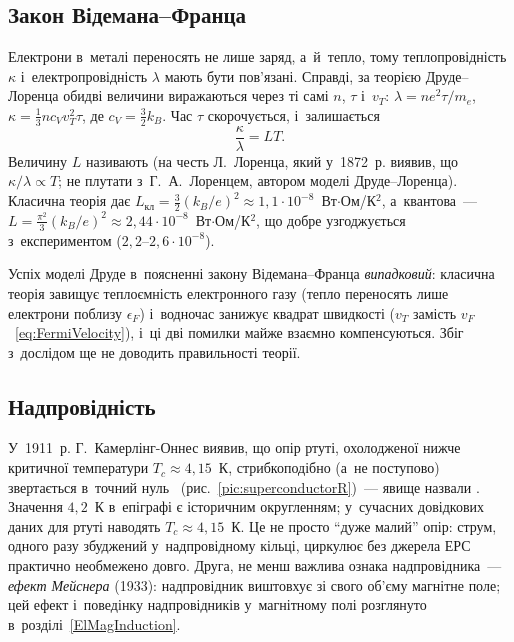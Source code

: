 \subsection*{Закон Відемана--Франца}


Електрони в~металі переносять не лише заряд, а~й~тепло, тому теплопровідність $\kappa$
і~електропровідність $\lambda$ мають бути пов'язані. Справді, за теорією Друде--Лоренца
обидві величини виражаються через ті самі $n$, $\tau$ і~$v_T$: $\lambda=ne^2\tau/m_e$,
$\kappa=\tfrac13nc_Vv_T^2\tau$, де $c_V=\tfrac32k_B$. Час $\tau$ скорочується,
і~залишається
\begin{equation}\label{eq:WiedemannFranz}
	\frac{\kappa}{\lambda} = L T.
\end{equation}
Величину $L$ називають  (на честь Л.~Лоренца, який у~1872~р. виявив,
що $\kappa/\lambda\propto T$; не плутати з~Г.~А.~Лоренцем, автором моделі Друде--Лоренца).
Класична теорія дає
$L_{\text{кл}}=\tfrac32(k_B/e)^2\approx1{,}1\cdot10^{-8}$~Вт$\cdot$Ом/К$^2$,
а~квантова~--- $L=\tfrac{\pi^2}{3}(k_B/e)^2\approx2{,}44\cdot10^{-8}$~Вт$\cdot$Ом/К$^2$,
що добре узгоджується з~експериментом ($2{,}2$--$2{,}6\cdot10^{-8}$).

\begin{Attention}[unbreakable]
	Успіх моделі Друде в~поясненні закону Відемана--Франца \emph{випадковий}: класична
	теорія завищує теплоємність електронного газу (тепло переносять лише електрони поблизу
	$\epsilon_F$) і~водночас занижує квадрат швидкості ($v_T$ замість
	$v_F$~\eqref{eq:FermiVelocity}), і~ці дві помилки майже взаємно компенсуються. Збіг
	з~дослідом ще не доводить правильності теорії.
\end{Attention}


\subsection*{Надпровідність}


У~1911~р. Г.~Камерлінг-Оннес виявив, що опір ртуті, охолодженої нижче критичної
температури $T_c\approx4{,}15$~К, стрибкоподібно (а~не поступово) звертається в~точний
нуль~\cite{Onnes1911} (рис.~\ref{pic:superconductorR})~--- явище назвали .
Значення $4{,}2$~К в~епіграфі є історичним округленням; у~сучасних довідкових даних
для ртуті наводять $T_c\approx4{,}15$~К. Це не
просто \enquote{дуже малий} опір: струм, одного разу збуджений у~надпровідному
кільці, циркулює без джерела ЕРС практично необмежено довго. Друга, не менш важлива
ознака надпровідника~--- \emph{ефект Мейснера} (1933): надпровідник виштовхує зі свого
об'єму магнітне поле; цей ефект і~поведінку надпровідників у~магнітному полі розглянуто
в~розділі~\ref{ElMagInduction}.

